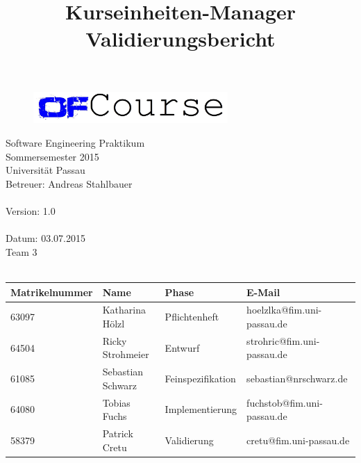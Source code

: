 \documentclass[a4paper, 12pt]{scrreprt}
\begin{document}
	\thispagestyle{plain}

\begin{titlepage}
    \begin{center}
        \begin{figure}[ht]
            \centering
            \includegraphics[width=0.66\textwidth, angle=0]{logo/name_blau_ofCourse.jpg}
        \end{figure}

    	\begin{title}
        	\title{\Huge{\textbf{Kurseinheiten-Manager \\ Validierungsbericht\\}}}

		\end{title}
		\hspace{3cm}

        	Software Engineering Praktikum \\
        	Sommersemester 2015\\
        	Universität Passau\\


        	Betreuer: Andreas Stahlbauer \\
        	\hspace{1,5cm}\\
        	Version: 1.0 \\
        	\hspace{1,5cm}\\
        	Datum: 03.07.2015\\[50pt]
        	Team 3 \\
    
		    \ \\
        
        \begin{tabular}{ | l | l | l | l |}
        	\hline
        	\textbf{Matrikelnummer} & \textbf{Name} & \textbf{Phase} & \textbf{E-Mail}  \\ \hline
        	63097 & Katharina Hölzl & Pflichtenheft & hoelzlka@fim.uni-passau.de \\ \hline
        	64504 & Ricky Strohmeier& Entwurf & strohric@fim.uni-passau.de  \\ \hline
        	61085 & Sebastian Schwarz & Feinspezifikation & sebastian@nrschwarz.de \\ \hline 
        	64080 & Tobias Fuchs & Implementierung  &  fuchstob@fim.uni-passau.de\\ \hline
        	58379 & Patrick Cretu  &  Validierung & cretu@fim.uni-passau.de \\ \hline
        \end{tabular}
        

\end{center}
\end{titlepage}
\end{document}
